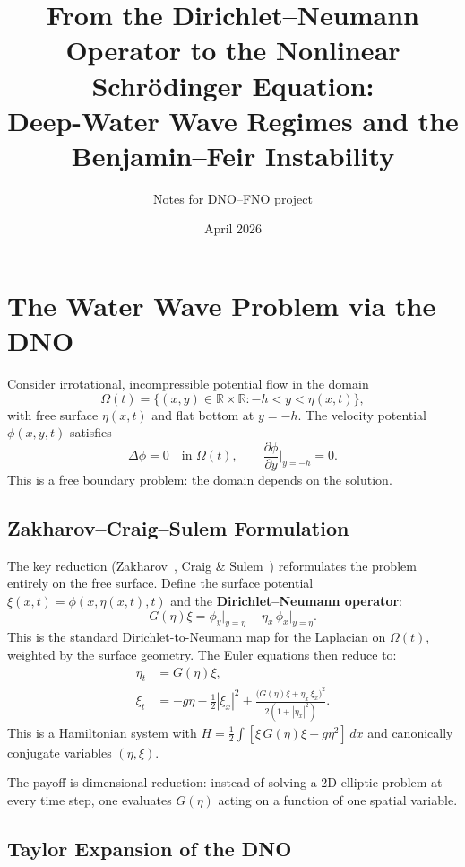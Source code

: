 \documentclass[11pt]{article}
\title{From the Dirichlet--Neumann Operator to the Nonlinear Schr\"odinger Equation:\\
Deep-Water Wave Regimes and the Benjamin--Feir Instability}
\author{Notes for DNO--FNO project}
\date{April 2026}
\newcommand{\R}{\mathbb{R}}
\newcommand{\pd}[2]{\frac{\partial #1}{\partial #2}}
\begin{document}
\maketitle

\tableofcontents
\newpage

\section{The Water Wave Problem via the DNO}

Consider irrotational, incompressible potential flow in the domain
\[
\Omega(t) = \{(x,y) \in \R \times \R : -h < y < \eta(x,t)\},
\]
with free surface $\eta(x,t)$ and flat bottom at $y = -h$.
The velocity potential $\phi(x,y,t)$ satisfies
\[
\Delta \phi = 0 \quad \text{in } \Omega(t), \qquad
\pd{\phi}{y}\bigg|_{y=-h} = 0.
\]
This is a free boundary problem: the domain depends on the solution.

\subsection{Zakharov--Craig--Sulem Formulation}

The key reduction (Zakharov~\cite{zakharov1968}, Craig \& Sulem~\cite{craig1993})
reformulates the problem entirely on the free surface.
Define the surface potential $\xi(x,t) = \phi(x,\eta(x,t),t)$ and the
\textbf{Dirichlet--Neumann operator}:
\[
G(\eta)\xi = \phi_y\big|_{y=\eta} - \eta_x\,\phi_x\big|_{y=\eta}.
\]
This is the standard Dirichlet-to-Neumann map for the Laplacian on $\Omega(t)$,
weighted by the surface geometry.
The Euler equations then reduce to:
\begin{align}
\eta_t &= G(\eta)\xi, \label{eq:kinematic}\\
\xi_t &= -g\eta - \tfrac{1}{2}|\xi_x|^2
+ \frac{\bigl(G(\eta)\xi + \eta_x\,\xi_x\bigr)^2}{2(1+|\eta_x|^2)}.
\label{eq:dynamic}
\end{align}
This is a Hamiltonian system with
$H = \frac{1}{2}\int[\xi\,G(\eta)\xi + g\eta^2]\,dx$
and canonically conjugate variables $(\eta, \xi)$.

The payoff is dimensional reduction: instead of solving a 2D elliptic
problem at every time step, one evaluates $G(\eta)$ acting on a function
of one spatial variable.

\subsection{Taylor Expansion of the DNO}
\end{document}
